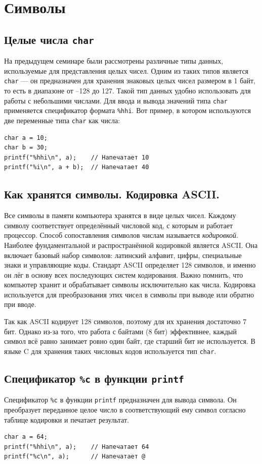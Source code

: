 \documentclass[10pt]{article}
\begin{document}
\section*{Символы}
\subsection*{Целые числа \texttt{char}}
На предыдущем семинаре были рассмотрены различные типы данных, используемые для представления целых чисел. Одним из таких типов является \texttt{char} — он предназначен для хранения знаковых целых чисел размером в 1 байт, то есть в диапазоне от –128 до 127. Такой тип данных удобно использовать для работы с небольшими числами. Для ввода и вывода значений типа \texttt{char} применяется спецификатор формата \texttt{\%hhi}. Вот пример, в котором используются две переменные типа \texttt{char} как числа:
\begin{lstlisting}
char a = 10;
char b = 30;
printf("%hhi\n", a);    // Напечатает 10
printf("%i\n", a + b);  // Напечатает 40
\end{lstlisting}


\subsection*{Как хранятся символы. Кодировка ASCII.}
Все символы в памяти компьютера хранятся в виде целых чисел. Каждому символу соответствует определённый числовой код, с которым и работает процессор. Способ сопоставления символов числам называется \textit{кодировкой}. Наиболее фундаментальной и распространённой кодировкой является ASCII. Она включает базовый набор символов: латинский алфавит, цифры, специальные знаки и управляющие коды. Стандарт ASCII определяет 128 символов, и именно он лёг в основу всех последующих систем кодирования. Важно помнить, что компьютер хранит и обрабатывает символы исключительно как числа. Кодировка используется для преобразования этих чисел в символы при выводе или обратно при вводе.

Так как ASCII кодирует 128 символов, поэтому для их хранения достаточно 7 бит. Однако из-за того, что работа с байтами (8 бит) эффективнее, каждый символ всё равно занимает ровно один байт, где старший бит не используется. В языке C для хранения таких числовых кодов используется тип \texttt{char}.

\subsection*{Спецификатор \texttt{\%c} в функции \texttt{printf}}
Спецификатор \texttt{\%c} в функции \texttt{printf} предназначен для вывода символа. Он преобразует переданное целое число в соответствующий ему символ согласно таблице кодировки и печатает результат.
\begin{lstlisting}
char a = 64;
printf("%hhi\n", a);	// Напечатает 64
printf("%c\n", a);		// Напечатает @
\end{lstlisting}
\end{document}
